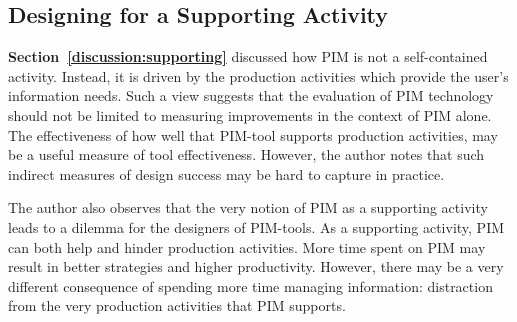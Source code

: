 \subsection{Designing for a Supporting Activity}
\label{discussion:methodology:supporting}

\textbf{Section~\ref{discussion:supporting}} discussed how PIM is not a self-contained activity.  Instead, it is driven by the production activities which provide the user's information needs.   Such a view suggests that the evaluation of PIM technology should not be limited to measuring improvements in the context of PIM alone.  The effectiveness of how well that PIM-tool supports production activities, may be a useful measure of tool effectiveness. %
However, the author notes that such indirect measures of design success may be hard to capture in practice.

The author also observes that the very notion of PIM as a supporting activity leads to a dilemma for the designers of PIM-tools. As a supporting activity, PIM can both help and hinder production activities.  More time spent on PIM may result in better strategies and higher productivity.  However, there may be a very different consequence of spending more time managing information: distraction from the very production activities that PIM supports. %

